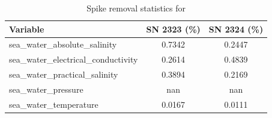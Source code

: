 \begin{table}[h]
\centering
\caption{Spike removal statistics for \projectname{} \casenumber{}}
\label{tab:ntas11_spike_stats}
\begin{tabular}{|l|c|c|}
\hline
Variable & SN 2323 (\%) & SN 2324 (\%) \\
\hline
sea\_water\_absolute\_salinity & 0.7342 & 0.2447 \\
sea\_water\_electrical\_conductivity & 0.2614 & 0.4839 \\
sea\_water\_practical\_salinity & 0.3894 & 0.2169 \\
sea\_water\_pressure & nan & nan \\
sea\_water\_temperature & 0.0167 & 0.0111 \\
\hline
\end{tabular}
\end{table}

